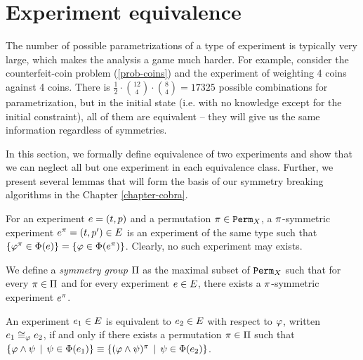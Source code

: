 \section{Experiment equivalence} \label{sec:expeq}


The number of possible parametrizations of
  a type of experiment is typically very large,
  which makes the analysis a game much harder.
For example, consider the counterfeit-coin problem (\ref{prob-coins})
  and the experiment of weighting 4 coins against 4 coins.
There is $\frac{1}{2}\cdot {12 \choose 4}\cdot{8 \choose 4} = 17325$
 possible combinations for parametrization, but
 in the initial state (i.e. with no knowledge except for the initial constraint),
 all of them are equivalent -- they will give us the same information regardless of symmetries.

In this section, we formally define equivalence of two experiments
 and show that we can neglect all but one experiment in each equivalence class.
Further, we present several lemmas that will form the basis of
 our symmetry breaking algorithms in the Chapter \ref{chapter-cobra}.

\begin{definition}
For an experiment $e = (t, p)$ and a permutation $\pi\in\mathtt{Perm}_X$,
  a $\pi$-symmetric experiment $e^\pi = (t, p')\in E$
  is an experiment of the same type such that
  $\{\varphi^\pi \in\Phi(e)\} = \{\varphi\in\Phi(e^\pi)\}$.
Clearly, no such experiment may exists.
\end{definition}

\begin{definition}
We define a \emph{symmetry group} $\Pi$ as
  the maximal subset of $\mathtt{Perm}_X$ such that for
  every $\pi\in\Pi$ and for every experiment $e\in E$,
  there exists a $\pi$-symmetric experiment $e^\pi$.
\end{definition}

\begin{definition}
An experiment $e_1\in E$ is equivalent to $e_2\in E$ with respect to $\varphi$,
  written $e_1\cong_{\varphi}e_2$,
  if and only if there exists a permutation $\pi\in\Pi$ such that
 $ \{ \varphi\wedge\psi \:\:|\:\: \psi\in\Phi(e_1) \} \equiv
   \{ (\varphi\wedge\psi)^\pi \:\:|\:\: \psi\in\Phi(e_2) \} $.
\end{definition}


